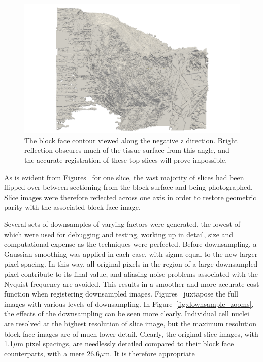     \begin{figure}
      \centering
      \includegraphics[width=\textheight]{Ch6/Figs/Rat28/contours/LoRes_negative_z}
      \caption{The block face contour viewed along the negative z direction. Bright reflection obscures much of the tissue surface from this angle, and the accurate registration of these top slices will prove impossible.}
      \label{fig:LoRes_negative_z}
    \end{figure}
    
	As is evident from Figures~ for one slice, the vast majority of slices had been flipped over between sectioning from the block surface and being photographed. Slice images were therefore reflected across one axis in order to restore geometric parity with the associated block face image.
	
	 Several sets of downsamples of varying factors were generated, the lowest of which were used for debugging and testing, working up in detail, size and computational expense as the techniques were perfected. Before downsampling, a Gaussian smoothing was applied in each case, with sigma equal to the new larger pixel spacing. In this way, all original pixels in the region of a large downsampled pixel contribute to its final value, and aliasing noise problems associated with the Nyquist frequency are avoided. This results in a smoother and more accurate cost function when registering downsampled images. Figures~ juxtapose the full images with various levels of downsampling. In Figure~\ref{fig:downsample_zooms}, the effects of the downsampling can be seen more clearly. Individual cell nuclei are resolved at the highest resolution of slice image, but the maximum resolution block face images are of much lower detail. Clearly, the original slice images, with 1.1$\mu$m pixel spacings, are needlessly detailed compared to their block face counterparts, with a mere 26.6$\mu$m. It is therefore appropriate
    

